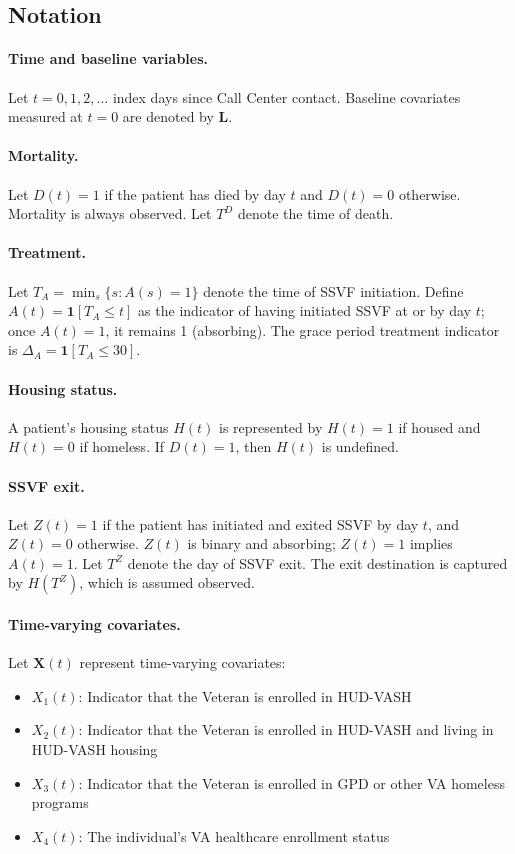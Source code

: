 
\subsection{Notation}

\paragraph{Time and baseline variables.}
Let $t = 0, 1, 2, \ldots$ index days since Call Center contact. Baseline covariates measured at $t = 0$ are denoted by $\boldsymbol{L}$.

\paragraph{Mortality.}
Let $D(t) = 1$ if the patient has died by day $t$ and $D(t) = 0$ otherwise. Mortality is always observed. Let $T^D$ denote the time of death.

\paragraph{Treatment.}
Let $T_A = \min_s \{s : A(s) = 1\}$ denote the time of SSVF initiation. Define $A(t) = \mathbf{1}[T_A \leq t]$ as the indicator of having initiated SSVF at or by day $t$; once $A(t) = 1$, it remains 1 (absorbing). The grace period treatment indicator is $\Delta_A = \mathbf{1}[T_A \leq 30]$.

\paragraph{Housing status.}
A patient's housing status $H(t)$ is represented by $H(t) = 1$ if housed and $H(t) = 0$ if homeless. If $D(t)=1$, then $H(t)$ is undefined. 

\paragraph{SSVF exit.}
Let $Z(t) = 1$ if the patient has initiated and exited SSVF by day $t$, and $Z(t) = 0$ otherwise. $Z(t)$ is binary and absorbing; $Z(t) = 1$ implies $A(t) = 1$. Let $T^Z$ denote the day of SSVF exit. The exit destination is captured by $H(T^Z)$, which is assumed observed.

\paragraph{Time-varying covariates.}
Let $\boldsymbol{X}(t)$ represent time-varying covariates:
\begin{itemize}
    \item $X_1(t)$: Indicator that the Veteran is enrolled in HUD-VASH
    \item $X_2(t)$: Indicator that the Veteran is enrolled in HUD-VASH and living in HUD-VASH housing
    \item $X_3(t)$: Indicator that the Veteran is enrolled in GPD or other VA homeless programs
    \item $X_4(t)$: The individual's VA healthcare enrollment status
\end{itemize}

